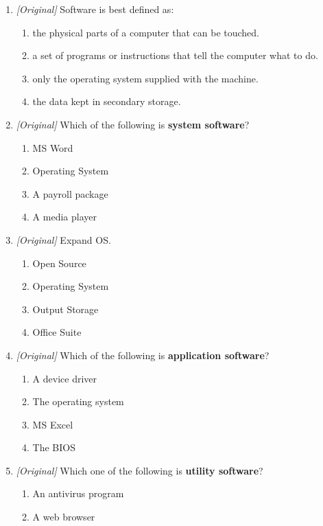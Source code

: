 \begin{enumerate}[label=\textbf{Q\arabic*.}, leftmargin=*]
\item \textit{[Original]} Software is best defined as:
  \begin{enumerate}[label=\Alph*.]
    \item the physical parts of a computer that can be touched.
    \item a set of programs or instructions that tell the computer what to do.
    \item only the operating system supplied with the machine.
    \item the data kept in secondary storage.
  \end{enumerate}
\item \textit{[Original]} Which of the following is \textbf{system software}?
  \begin{enumerate}[label=\Alph*.]
    \item MS Word
    \item Operating System
    \item A payroll package
    \item A media player
  \end{enumerate}
\item \textit{[Original]} Expand OS.
  \begin{enumerate}[label=\Alph*.]
    \item Open Source
    \item Operating System
    \item Output Storage
    \item Office Suite
  \end{enumerate}
\item \textit{[Original]} Which of the following is \textbf{application
  software}?
  \begin{enumerate}[label=\Alph*.]
    \item A device driver
    \item The operating system
    \item MS Excel
    \item The BIOS
  \end{enumerate}
\item \textit{[Original]} Which one of the following is \textbf{utility
  software}?
  \begin{enumerate}[label=\Alph*.]
    \item An antivirus program
    \item A web browser

\end{enumerate}
\end{enumerate}
